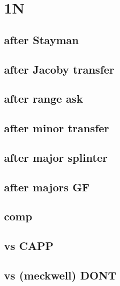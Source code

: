 \section{1N}


\subsection{after Stayman}


\subsection{after Jacoby transfer}


\subsection{after range ask}


\subsection{after minor transfer}


\subsection{after major splinter}


\subsection{after majors GF}


\subsection{comp}


\subsection{vs CAPP}


\subsection{vs (meckwell) DONT}




